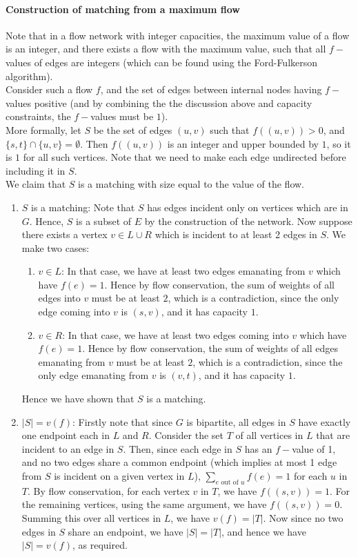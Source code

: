 \documentclass[answers]{exam}
\newcommand{\nl}{\vspace{0.2cm}\\}
\begin{document}
\begin{questions}
\begin{parts}
\begin{solution}
\paragraph{Construction of matching from a maximum flow}
Note that in a flow network with integer capacities, the maximum value of a flow is an integer, and there exists a flow with the maximum value, such that all $f-$values of edges are integers (which can be found using the Ford-Fulkerson algorithm).\nl
Consider such a flow $f$, and the set of edges between internal nodes having $f-$values positive (and by combining the the discussion above and capacity constraints, the $f-$values must be $1$).\nl
More formally, let $S$ be the set of edges $(u, v)$ such that $f((u, v)) > 0$, and $\{s, t\} \cap \{u, v\} = \emptyset$. Then $f((u, v))$ is an integer and upper bounded by $1$, so it is $1$ for all such vertices. Note that we need to make each edge undirected before including it in $S$.\nl
We claim that $S$ is a matching with size equal to the value of the flow.
\begin{enumerate}
    \item $S$ is a matching: Note that $S$ has edges incident only on vertices which are in $G$. Hence, $S$ is a subset of $E$ by the construction of the network. Now suppose there exists a vertex $v \in L \cup R$ which is incident to at least 2 edges in $S$. We make two cases:
    \begin{enumerate}
        \item $v \in L$: In that case, we have at least two edges emanating from $v$ which have $f(e) = 1$. Hence by flow conservation, the sum of weights of all edges into $v$ must be at least $2$, which is a contradiction, since the only edge coming into $v$ is $(s, v)$, and it has capacity $1$.
        \item $v \in R$: In that case, we have at least two edges coming into $v$ which have $f(e) = 1$. Hence by flow conservation, the sum of weights of all edges emanating from $v$ must be at least $2$, which is a contradiction, since the only edge emanating from $v$ is $(v, t)$, and it has capacity $1$.
    \end{enumerate}
    Hence we have shown that $S$ is a matching.
    \item $|S| = v(f)$: Firstly note that since $G$ is bipartite, all edges in $S$ have exactly one endpoint each in $L$ and $R$. Consider the set $T$ of all vertices in $L$ that are incident to an edge in $S$. Then, since each edge in $S$ has an $f-$value of 1, and no two edges share a common endpoint (which implies at most 1 edge from $S$ is incident on a given vertex in $L$), $\sum_{e \text{ out of }u} f(e) = 1$ for each $u$ in $T$. By flow conservation, for each vertex $v$ in $T$, we have $f((s, v)) = 1$. For the remaining vertices, using the same argument, we have $f((s, v)) = 0$. Summing this over all vertices in $L$, we have $v(f) = |T|$. Now since no two edges in $S$ share an endpoint, we have $|S| = |T|$, and hence we have $|S| = v(f)$, as required.
\end{enumerate}


\end{solution}
\end{parts}
\end{questions}
\end{document}

